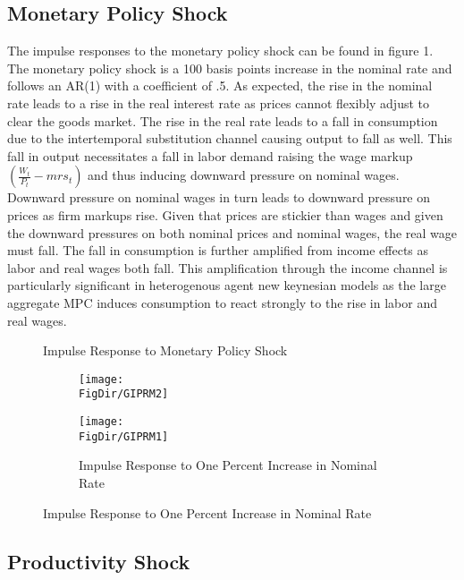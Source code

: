 \documentclass[titlepage]{\econtex}\providecommand{\texname}{BufferStockTheory}
\providecommand{\FigDir}{Figures}
\begin{document}
\hypertarget{Monetary Policy Shock}{}
\subsection{Monetary Policy Shock}

The impulse responses to the monetary policy shock can be found in figure 1. The monetary policy shock is a 100 basis points increase in the nominal rate and follows an AR(1) with a coefficient of .5.  As expected, the rise in the nominal rate leads to a rise in the real interest rate as prices cannot flexibly adjust to clear the goods market. The rise in the real rate leads to a fall in consumption due to the intertemporal substitution channel  causing output to fall as well. This fall in output necessitates a fall in labor demand raising the wage markup $(\frac{W_{t}}{P_{t}} - mrs_{t})$ and thus inducing downward pressure on nominal wages. Downward pressure on nominal wages in turn leads to downward pressure on prices as firm markups rise. Given that prices are stickier than wages and given the downward pressures on both nominal prices and nominal wages, the real wage must fall. The fall in consumption is further amplified from income effects as labor and real wages both fall.  This amplification through the income channel is particularly significant in heterogenous agent new keynesian models as the large aggregate MPC induces consumption to react strongly to the rise in labor and real wages. 


\begin{figure}{Impulse Response to Monetary Policy Shock}
  \begin{subfigure}{}
    \centering\texttt{[image: \\FigDir/GIPRM2]}
  \end{subfigure}
  \begin{subfigure}{}
    \centering\texttt{[image: \\FigDir/GIPRM1]}
    \caption{ Impulse Response to One Percent Increase in Nominal Rate}
  \end{subfigure}
\end{figure}


\hypertarget{Productivity Shock}{}
\subsection{Productivity Shock}
\end{document}
